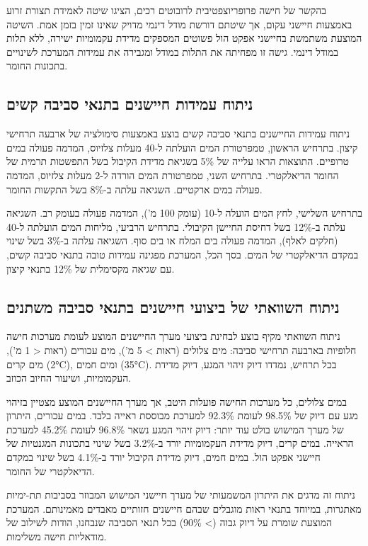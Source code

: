 בהקשר של חישה פרופריוצפטיבית לרובוטים רכים, \cite{Renda2018} הציגו שיטה לאמידת תצורת זרוע באמצעות חיישני עקום, אך שיטתם דורשת מודל דינמי מדויק שאינו זמין בזמן אמת. השיטה המוצעת משתמשת בחיישני אפקט הול פשוטים המספקים מדידת עקמומיות ישירה, ללא תלות במודל דינמי. גישה זו מפחיתה את התלות במודל ומגבירה את עמידות המערכת לשינויים בתכונות החומר.

\subsection{ניתוח עמידות חיישנים בתנאי סביבה קשים}
\label{sec:sensors_durability}

ניתוח עמידות החיישנים בתנאי סביבה קשים בוצע באמצעות סימולציה של ארבעה תרחישי קיצון. בתרחיש הראשון, טמפרטורת המים הועלתה ל-40 מעלות צלזיוס, המדמה פעולה במים טרופיים. התוצאות הראו עלייה של 5\% בשגיאת מדידת הקיבול בשל התפשטות תרמית של החומר הדיאלקטרי. בתרחיש השני, טמפרטורת המים הורדה ל-2 מעלות צלזיוס, המדמה פעולה במים ארקטיים. השגיאה עלתה ב-8\% בשל התקשות החומר.

בתרחיש השלישי, לחץ המים הועלה ל-10  (עומק 100 מ'), המדמה פעולה בעומק רב. השגיאה עלתה ב-12\% בשל דחיסת החיישן הקיבולי. בתרחיש הרביעי, מליחות המים הועלתה ל-40  (חלקים לאלף), המדמה פעולה בים המלח או בים סוף. השגיאה עלתה ב-3\% בשל שינוי במקדם הדיאלקטרי של המים. בסך הכל, המערכת מפגינה עמידות טובה בתנאי סביבה קשים, עם שגיאה מקסימלית של 12\% בתנאי קיצון.

\subsection{ניתוח השוואתי של ביצועי חיישנים בתנאי סביבה משתנים}
\label{sec:sensors_comparative_analysis}

ניתוח השוואתי מקיף בוצע לבחינת ביצועי מערך החיישנים המוצע לעומת מערכות חישה חלופיות בארבעה תרחישי סביבה: מים צלולים (ראות > 5 מ'), מים עכורים (ראות < 1 מ'), מים קרים (2°C), ומים חמים (35°C). בכל תרחיש, נמדדו דיוק זיהוי המגע, דיוק מדידת העקמומיות, ושיעור החיוב הכוזב.

במים צלולים, כל מערכות החישה פועלות היטב, אך מערך החיישנים המוצע מצטיין בזיהוי מגע עם דיוק של 98.5\% לעומת 92.3\% למערכת מבוססת ראייה בלבד. במים עכורים, היתרון של מערך המישוש בולט עוד יותר: דיוק זיהוי המגע נשאר 96.8\% לעומת 45.2\% למערכת הראייה. במים קרים, דיוק מדידת העקמומיות יורד ב-3.2\% בשל שינוי בתכונות המגנטיות של חיישני אפקט הול. במים חמים, דיוק מדידת הקיבול יורד ב-4.1\% בשל שינוי במקדם הדיאלקטרי של החומר.

ניתוח זה מדגים את היתרון המשמעותי של מערך חיישני המישוש המבוזר בסביבות תת-ימיות מאתגרות, במיוחד בתנאי ראות מוגבלים שבהם חיישנים חזותיים מאבדים מאמינותם. המערכת המוצעת שומרת על דיוק גבוה (> 90\%) בכל תנאי הסביבה שנבחנו, הודות לשילוב של מודאליות חישה משלימות.

